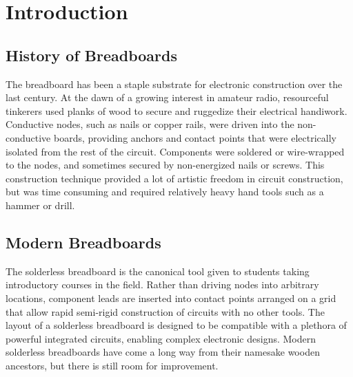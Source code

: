 \chapter{Introduction}

\section{History of Breadboards}

The breadboard has been a staple substrate for electronic construction over the last century.
At the dawn of a growing interest in amateur radio, resourceful tinkerers used planks of wood to secure and ruggedize their electrical handiwork.
Conductive nodes, such as nails or copper rails, were driven into the non-conductive boards, providing anchors and contact points that were electrically isolated from the rest of the circuit.
Components were soldered or wire-wrapped to the nodes, and sometimes secured by non-energized nails or screws.
This construction technique provided a lot of artistic freedom in circuit construction, but was time consuming and required relatively heavy hand tools such as a hammer or drill.


\section{Modern Breadboards}

The solderless breadboard is the canonical tool given to students taking introductory courses in the field.
Rather than driving nodes into arbitrary locations, component leads are inserted into contact points arranged on a grid that allow rapid semi-rigid construction of circuits with no other tools.
The layout of a solderless breadboard is designed to be compatible with a plethora of powerful integrated circuits, enabling complex electronic designs.
Modern solderless breadboards have come a long way from their namesake wooden ancestors, but there is still room for improvement.

